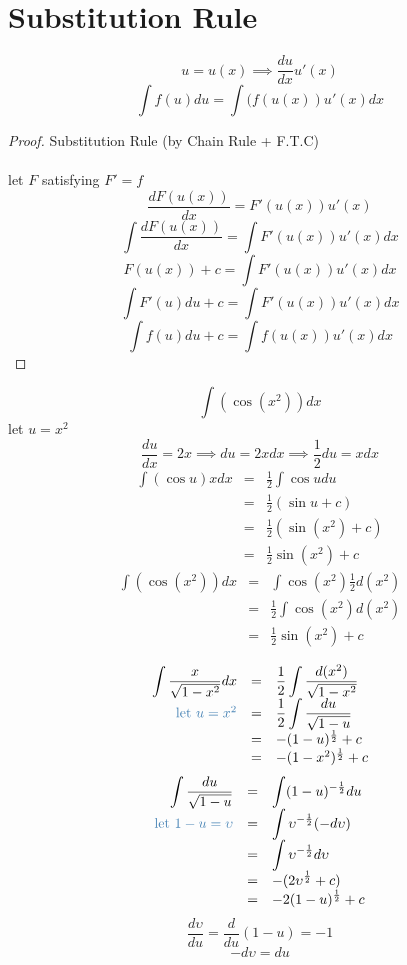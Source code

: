 \section{Substitution Rule}
\begin{defn}
$$\displaystyle u = u(x) \implies \frac{du}{dx} u'(x)$$
$$\displaystyle \int f(u)du = \int(f(u(x)) u'(x) dx$$
\end{defn}
\begin{proof} Substitution Rule (by Chain Rule + F.T.C)\\\\
let $F$ satisfying $F'=f$\\
$$\displaystyle \frac{dF(u(x))}{dx} = F'(u(x))u'(x)$$
$$\displaystyle \int \frac{dF(u(x))}{dx}= \int F'(u(x))u'(x)dx$$
$$\displaystyle F(u(x))+c = \int F'(u(x))u'(x)dx$$
$$\displaystyle \int F'(u)du + c= \int F'(u(x)) u'(x) dx$$
$$\displaystyle \int f(u)du + c = \int f(u(x))u'(x)dx$$
\end{proof}
\begin{eg}
$$\displaystyle \int (\cos (x^2)) dx$$
let $\displaystyle u = x^2$ 
$$\frac{du}{dx} =2x \implies du = 2x dx \implies \frac{1}{2} du = xdx$$
$$\begin{array}{rcl}
\displaystyle \int (\cos u)x dx & = & \displaystyle \frac{1}{2} \int \cos u du\\
& = & \displaystyle \frac{1}{2} (\sin u +c)\\
& = & \displaystyle \frac{1}{2} (\sin (x^2) + c)\\
& = & \displaystyle \frac{1}{2} \sin (x^2) + c
\end{array}$$
$$\begin{array}{rcl}
\displaystyle \int (\cos (x^2)) dx & = & \int \cos (x^2) \frac{1}{2}d(x^2)\\
& = & \displaystyle \frac{1}{2} \int \cos (x^2) d(x^2)\\
& = & \displaystyle \frac{1}{2} \sin (x^2) + c
\end{array}$$
\end{eg}
\begin{eg}
$$\begin{array}{rcl}
\displaystyle \int \frac{x}{\sqrt{1-x^2}} dx & = & \displaystyle \frac{1}{2} \int \frac{d(x^2)}{\sqrt{1-x^2}}\\
\tssteelblue{\text{let }u = x^2} & = & \displaystyle \frac{1}{2} \int \frac{du}{\sqrt{1-u}}\\
& = & -(1- u)^{\frac{1}{2}} +c\\
& = & -(1-x^2)^{\frac{1}{2}} + c
\end{array}$$
$$\begin{array}{rcl}
\displaystyle \int \frac{du}{\sqrt{1-u}} & = & \displaystyle \int (1-u)^{-\frac{1}{2}} du\\
\tssteelblue{\text{let } 1-u = \upsilon}& = & \displaystyle \int \upsilon^{-\frac{1}{2}} (-d\upsilon)\\
& = & \displaystyle \int \upsilon^{-\frac{1}{2}} d\upsilon\\
& = & \displaystyle -(2\upsilon^{\frac{1}{2}} + c)\\
& = & \displaystyle -2(1-u)^{\frac{1}{2}} + c
\end{array}$$
$$\displaystyle \frac{d\upsilon}{du} = \displaystyle \frac{d}{du}(1-u) = -1$$
$$-d\upsilon = du$$
\end{eg}
